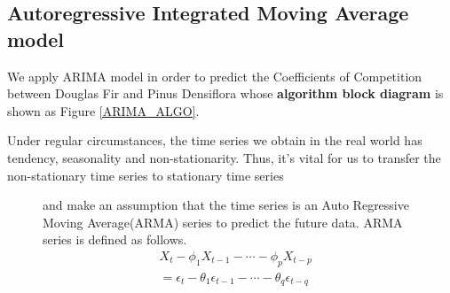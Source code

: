 \documentclass{mcmthesis}
\numberwithin{figure}{section}
\numberwithin{table}{section}
\numberwithin{equation}{section}
\begin{document}
\subsection{Autoregressive Integrated Moving Average model}

We apply ARIMA model in order to predict the Coefficients of Competition between 
Douglas Fir and Pinus Densiflora whose \textbf{algorithm block diagram} 
is shown as Figure \ref{ARIMA_ALGO}.
\par
Under regular circumstances, the time series we obtain in the real world
  has tendency, seasonality and non-stationarity. Thus, it's vital for 
  us to transfer the non-stationary time series to stationary time series
\par
\begin{figure}[ht]
\begin{minipage}[htbp]{0.37\linewidth}
  and make an assumption that the time series is an Auto 
  Regressive Moving Average(ARMA) series to predict the 
  future data. ARMA series is defined as follows.
  \begin{align*}
    &X_t-\phi_1X_{t-1}-\cdots -\phi_pX_{t-p} \\
    &= \epsilon_t - \theta_1\epsilon_{t-1}-\cdots-\theta_q\epsilon_{t-q}
  \end{align*}
 

\end{minipage}
\end{figure}
\end{document}
